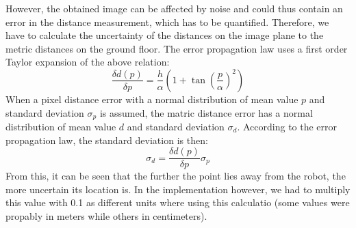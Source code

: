 \documentclass[12pt]{article}
\begin{document}
However, the obtained image can be affected by noise and could thus contain an error in the distance measurement, which has to be quantified. Therefore, we have to calculate the uncertainty of the distances on the image plane to the metric distances on the ground floor. The error propagation law uses a first order Taylor expansion of the above relation:
\begin{equation}
\frac{\delta d(p)}{\delta p} = \frac{h}{\alpha} (1+\tan{(\frac{p}{\alpha})}^2)
\end{equation}
When a pixel distance error with a normal distribution of mean value $p$ and standard deviation $\sigma_p$ is assumed, the matric distance error has a normal distribution of mean value $d$ and standard deviation $\sigma_d$. According to the error propagation law, the standard deviation is then:
\begin{equation}
\sigma_d = \frac{\delta d(p)}{\delta p} \sigma_p
\end{equation}
From this, it can be seen that the further the point lies away from the robot, the more uncertain its location is. In the implementation however, we had to multiply this value with 0.1 as different units where using this calculatio (some values were propably in meters while others in centimeters).
\end{document}

